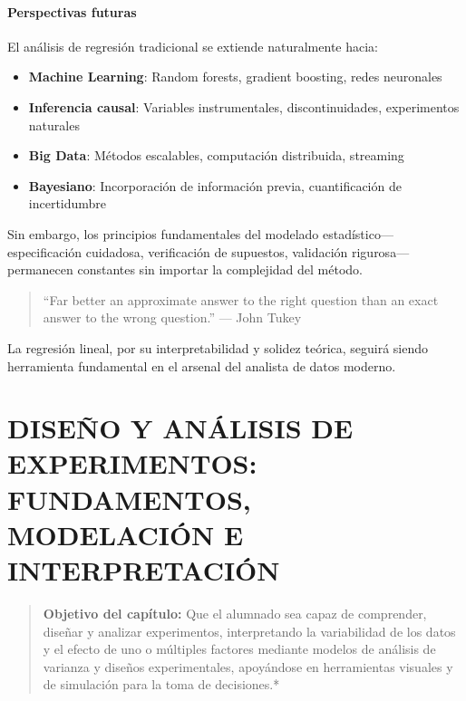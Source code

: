 \documentclass[
  oneside]{book}
\providecommand{\tightlist}{%
  \setlength{\itemsep}{0pt}\setlength{\parskip}{0pt}}
\begin{document}
\subsubsection{Perspectivas futuras}\label{perspectivas-futuras}

El análisis de regresión tradicional se extiende naturalmente hacia:

\begin{itemize}
\tightlist
\item
  \textbf{Machine Learning}: Random forests, gradient boosting, redes neuronales
\item
  \textbf{Inferencia causal}: Variables instrumentales, discontinuidades, experimentos naturales
\item
  \textbf{Big Data}: Métodos escalables, computación distribuida, streaming
\item
  \textbf{Bayesiano}: Incorporación de información previa, cuantificación de incertidumbre
\end{itemize}

Sin embargo, los principios fundamentales del modelado estadístico---especificación cuidadosa, verificación de supuestos, validación rigurosa---permanecen constantes sin importar la complejidad del método.

\begin{quote}
``Far better an approximate answer to the right question than an exact answer to the wrong question.'' --- John Tukey
\end{quote}

La regresión lineal, por su interpretabilidad y solidez teórica, seguirá siendo herramienta fundamental en el arsenal del analista de datos moderno.

\chapter{DISEÑO Y ANÁLISIS DE EXPERIMENTOS: FUNDAMENTOS, MODELACIÓN E INTERPRETACIÓN}\label{diseuxf1o-y-anuxe1lisis-de-experimentos-fundamentos-modelaciuxf3n-e-interpretaciuxf3n}

\begin{quote}
\textbf{Objetivo del capítulo:} Que el alumnado sea capaz de comprender, diseñar y analizar experimentos, interpretando la variabilidad de los datos y el efecto de uno o múltiples factores mediante modelos de análisis de varianza y diseños experimentales, apoyándose en herramientas visuales y de simulación para la toma de decisiones.*
\end{quote}
\end{document}
